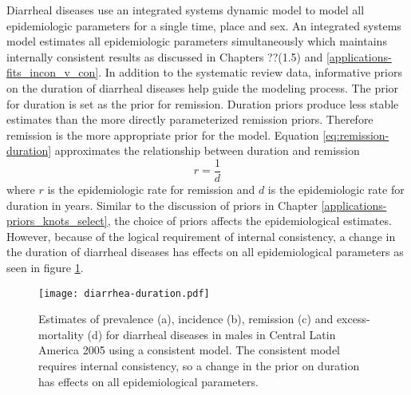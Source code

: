 Diarrheal diseases use an integrated systems dynamic model to model all epidemiologic parameters for a single time, place and sex.  An integrated systems model estimates all epidemiologic parameters simultaneously which maintains internally consistent results as discussed in Chapters ??(1.5) and \ref{applications-fits_incon_v_con}.  In addition to the systematic review data, informative priors on the duration of diarrheal diseases help guide the modeling process.  The prior for duration is set as the prior for remission.  Duration priors produce less stable estimates than the more directly parameterized remission priors.  Therefore remission is the more appropriate prior for the model.  Equation \ref{eq:remission-duration} approximates the relationship between duration and remission
    \begin{equation} \label{eq:remission-duration}
    	r = \frac{1}{d}
    \end{equation}
where $r$ is the epidemiologic rate for remission and $d$ is the epidemiologic rate for duration in years.  Similar to the discussion of priors in Chapter \ref{applications-priors_knots_select}, the choice of priors affects the epidemiological estimates.  However, because of the logical requirement of internal consistency, a change in the duration of diarrheal diseases has effects on all epidemiological parameters as seen in figure \ref{fig:app-diarrhea duration}.

    \begin{figure}[h]
        \begin{center}
            \texttt{[image: diarrhea-duration.pdf]}
            \caption{Estimates of prevalence (a), incidence (b), remission (c) and excess-mortality (d) for diarrheal diseases in males in Central Latin America 2005 using a consistent model.  The consistent model requires internal consistency, so a change in the prior on duration has effects on all epidemiological parameters.}
            \label{fig:app-diarrhea duration}
        \end{center}
    \end{figure}
